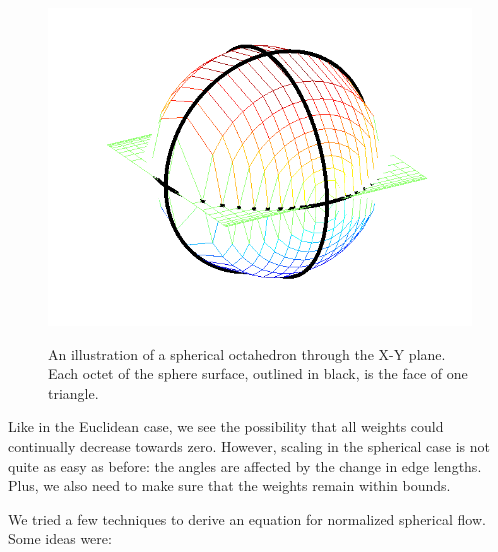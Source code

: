 \documentclass[12pt]{article}
\begin{document}
\begin{figure}
\centering
\includegraphics[scale = 0.6]{Pictures3/octosph.png}
\label{OctoSph}
\caption{An illustration of a spherical octahedron through the X-Y plane. Each octet of the sphere surface, outlined in black, is the face of one triangle.} 
\end{figure}

 Like in the Euclidean case, we see the possibility that all weights could continually decrease towards zero. However, scaling in the spherical case is not quite as easy as before: the angles are affected by the change in edge lengths. Plus, we also need to make sure that the weights remain within bounds.

 We tried a few techniques to derive an equation for normalized spherical flow. Some ideas were:
\end{document}
